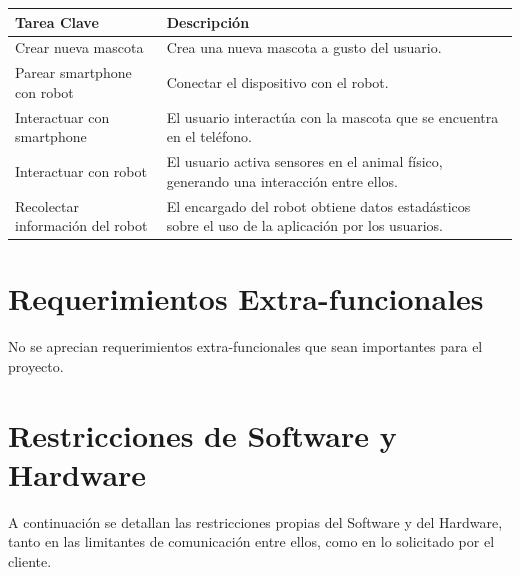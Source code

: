 \documentclass[letterpaper,12pt]{article} %
\numberwithin{equation}{section} %
\numberwithin{figure}{section} %
\numberwithin{table}{section} %
\begin{document}
\begin{table}[H]
  \centering
  \begin{tabular}{p{5cm}p{9cm}}\hline
    Tarea Clave & Descripci\'on \\ \hline\hline %
    Crear nueva mascota & Crea una nueva mascota a gusto del usuario. \\ \hline
    Parear smartphone con robot & Conectar el dispositivo con el robot. \\ \hline
    Interactuar con smartphone & El usuario interact\'ua con la mascota que se encuentra en el tel\'efono. \\ \hline
    Interactuar con robot & El usuario activa sensores en el animal f\'isico, generando una interacci\'on entre ellos. \\ \hline
    Recolectar informaci\'on del robot & El encargado del robot obtiene datos estad\'asticos sobre el uso de la aplicaci\'on por los usuarios. \\ \hline\hline
  \end{tabular}
\end{table}

\newpage
\section{Requerimientos Extra-funcionales}

No se aprecian requerimientos extra-funcionales que sean importantes para el proyecto.\\


\newpage
\section{Restricciones de Software y Hardware}

A continuaci\'on se detallan las restricciones propias del Software y del Hardware, tanto en las limitantes de comunicaci\'on entre ellos, como en lo solicitado por el cliente.\\
\end{document}
